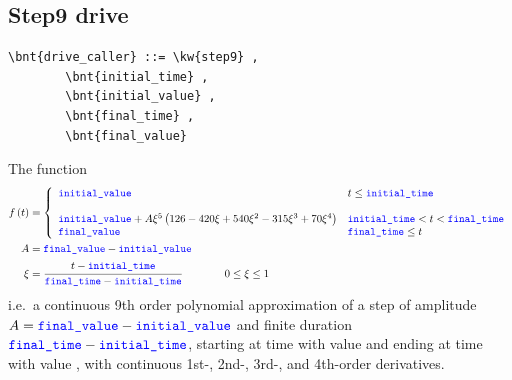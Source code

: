 \subsection{Step9 drive}
\begin{Verbatim}[commandchars=\\\{\}]
    \bnt{drive_caller} ::= \kw{step9} ,
        \bnt{initial_time} , 
        \bnt{initial_value} ,
        \bnt{final_time} ,
        \bnt{final_value}
\end{Verbatim}    
The function
\begin{align}
	f\plbr{t} &= 
	\lcubr{\matr{ll}{
		\nt{initial\_value} %
			& t \le \nt{initial\_time} \\
		\\
		\nt{initial\_value} + A \xi^5 \plbr{126 - 420 \xi + 540 \xi^2 - 315 \xi^3 + 70 \xi^4}
			& \nt{initial\_time} < t < \nt{final\_time}
		\\
		\nt{final\_value}
			& \nt{final\_time} \le t \\
	}}
	\\
	A &= \nt{final\_value} - \nt{initial\_value}
	\nonumber \\
	\xi &= \cfrac{t - \nt{initial\_time}}{\nt{final\_time} - \nt{initial\_time}}
	\hspace{40pt} 0 \le \xi \le 1
	\nonumber 
\end{align}
i.e.\ a continuous 9th order polynomial approximation of a step of amplitude $A = \textcolor{blue}{\texttt{final\_value}} - \textcolor{blue}{\texttt{initial\_value}}$
and finite duration $\textcolor{blue}{\texttt{final\_time}} - \textcolor{blue}{\texttt{initial\_time}}$,
starting at time  with value  and ending at time  with value ,
with continuous 1st-, 2nd-, 3rd-, and 4th-order derivatives.

